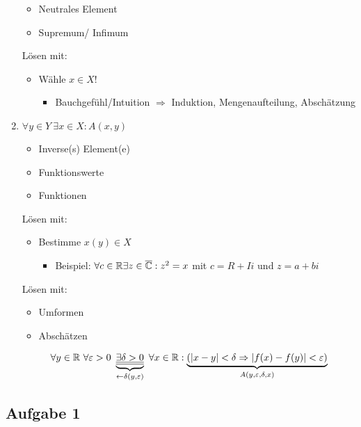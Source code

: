 \begin{enumerate}[label=\arabic*)]
    \begin{itemize}
        \item Neutrales Element
        \item Supremum/ Infimum
    \end{itemize}
    Lösen mit:
    \begin{itemize}
        \item Wähle $x \in X!$ 
        \begin{itemize}
            \item Bauchgefühl/Intuition $\Rightarrow$ Induktion, Mengenaufteilung, Abschätzung
        \end{itemize}
    \end{itemize}
    \item $\forall y \in Y \ \exists x \in X: A(x, y)$
    \begin{itemize}
        \item Inverse(s) Element(e)
        \item Funktionswerte
        \item Funktionen
    \end{itemize}
    Lösen mit:
    \begin{itemize}
        \item Bestimme $x(y) \in X $ 
        \begin{itemize}
            \item Beispiel: $\forall c \in \mathbb R \exists z \in \overline{\mathbb C}: z^2 = x$ mit $c = R + I i$ und $z = a + bi$
        \end{itemize}
    \end{itemize}
    Lösen mit:
        \begin{itemize}
            \item Umformen
            \item Abschätzen
        \end{itemize}
        \begin{align*}
    \forall y \in \R \ \forall \varepsilon > 0 \ \underbrace{\underline{\underline{\exists \delta > 0}}}_{\leftarrow \delta(y, \varepsilon)} \ \forall x \in \R: \underbrace{(|x - y| < \delta \Rightarrow |f(x) - f(y)| < \varepsilon)}_{A(y, \varepsilon, \delta , x)}
\end{align*}
\end{enumerate}

\newpage
\subsection{Aufgabe 1}

